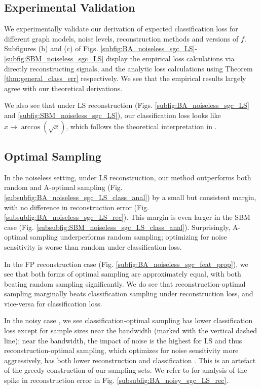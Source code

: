 \subsection{Experimental Validation}
We experimentally validate our derivation of expected classification loss for different graph models, noise levels, reconstruction methods and versions of $f$. Subfigures (b) and (c) of Figs. \ref{subfig:BA_noiseless_sgc_LS}-\ref{subfig:SBM_noiseless_sgc_LS} display the empirical loss calculations via directly reconstructing signals, and the analytic loss calculations using Theorem \ref{thm:general_class_err} respectively. We see that the empirical results largely agree with our theoretical derivations.

We also see that under  LS reconstruction (Figs. \ref{subfig:BA_noiseless_sgc_LS} and \ref{subfig:SBM_noiseless_sgc_LS}), our classification loss looks like $x \to \arccos\left(\sqrt{x}\right)$, which follows the theoretical interpretation in \bs{\ref{sec:Gen_Theory}}.


\subsection{Optimal Sampling}
\label{sec:optimal_sampling_results}
In the noiseless setting, under LS reconstruction, our method outperforms both random and A-optimal sampling (Fig. 
\ref{subsubfig:BA_noiseless_sgc_LS_class_anal}) by a small but consistent margin, with no difference in reconstruction error (Fig. \ref{subsubfig:BA_noiseless_sgc_LS_rec}). This margin is even larger in the SBM case (Fig. \ref{subsubfig:SBM_noiseless_sgc_LS_class_anal}). Surprisingly, A-optimal sampling underperforms random sampling; optimizing for noise sensitivity is worse than random under classification loss. 

In the FP reconstruction case (Fig. \ref{subfig:BA_noiseless_sgc_feat_prop}), we see that both forms of optimal sampling are approximately equal, with both beating random sampling significantly. We do see that reconstruction-optimal sampling marginally beats classification sampling under reconstruction loss, and vice-versa for classification loss.

In the noisy case , we see classification-optimal sampling has lower classification loss except for sample sizes near the bandwidth (marked with the vertical dashed line); near the bandwidth, the impact of noise is the highest for LS \cite{sripathmanathan2024impact} and thus reconstruction-optimal sampling, which optimizes for noise sensitivity more aggressively, has both lower reconstruction and classification . This is an artefact of the greedy construction of our sampling sets. We refer to \cite{sripathmanathan2024impact} for analysis of the spike in reconstruction error in Fig. \ref{subsubfig:BA_noisy_sgc_LS_rec}.

